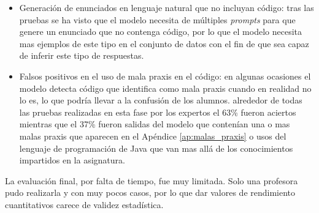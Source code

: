 \begin{itemize}
    \item Generación de enunciados en lenguaje natural que no incluyan código: tras las pruebas se ha visto que el modelo necesita de múltiples \textit{prompts} para que genere un enunciado que no contenga código, por lo que el modelo necesita mas ejemplos de este tipo en el conjunto de datos con el fin de que sea capaz de inferir este tipo de respuestas.
    
    \item Falsos positivos en el uso de mala praxis en el código: en algunas ocasiones el modelo detecta código que identifica como mala praxis cuando en realidad no lo es, lo que podría llevar a la confusión de los alumnos. alrededor de todas las pruebas realizadas en esta fase por los expertos el 63\% fueron aciertos mientras que el 37\% fueron salidas del modelo que contenían una o mas malas praxis que aparecen en el Apéndice \ref{ap:malas_praxis} o usos del lenguaje de programación de Java que van mas allá de los conocimientos impartidos en la asignatura.
    
\end{itemize}

La evaluación final, por falta de tiempo, fue muy limitada. Solo una profesora pudo realizarla y con muy pocos casos, por lo que dar valores de rendimiento cuantitativos carece de validez estadística.
